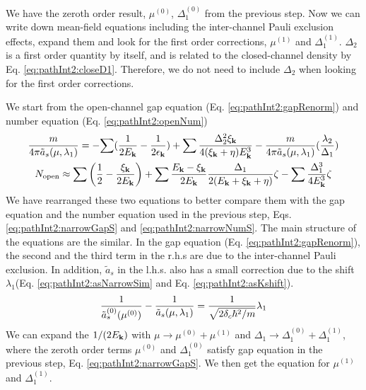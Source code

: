  
  We have the zeroth order result, $\mu^{(0)}$,  $\Delta_1^{(0)}$ from the previous step.  Now we can write down mean-field equations   including the inter-channel Pauli exclusion effects,  expand them and look for the first order corrections,  $\mu^{(1)}$ and $\Delta_1^{(1)}$.
$\Delta_{2}$ is a first order quantity by itself,  and is related to the closed-channel density by Eq. \ref{eq:pathInt2:closeD1}. Therefore, we do not need to include $\Delta_{2}$ when looking for the first order corrections. 


We start from the open-channel  gap equation (Eq. \ref{eq:pathInt2:gapRenorm}) and number equation (Eq. \ref{eq:pathInt2:openNum}) 
\begin{gather}
\frac{m}{4\pi{\tilde{a}_{s}(\mu,\lambda_{1})}}=-{\sum(\nth{2E_{\vk}}-\nth{2\epsilon_{\vk}})
+\sum\frac{\Delta_{2}^{2}\xi_{\vk}}{4(\xi_{\vk}+\eta){E_{\vk}^{3}}}}
-\frac{m}{4\pi{\tilde{a}_{s}(\mu,\lambda_{1})}}(\frac{\lambda_{2}}{\Delta_{1}})
	\\
N_{\text{open}}\approx\sum{\br{\nth{2}-\frac{\xi_\vk}{2E_\vk}}+\sum\frac{E_\vk-\xi_\vk}{2E_\vk}\frac{\Delta_{1}}{2(E_{\vk}+\xi_{\vk}+\eta)}\zeta -\sum\frac{\Delta_{1}^{3}}{4E_\vk^{3}}\zeta}%
\end{gather}
We have rearranged these two equations to better compare them  with  the gap equation and the number equation used in the previous step, Eqs. \ref{eq:pathInt2:narrowGapS} and \ref{eq:pathInt2:narrowNumS}.        The main structure of the equations are the similar. In the gap equation (Eq. \ref{eq:pathInt2:gapRenorm}), the second and the third term in the r.h.s are due to the inter-channel Pauli exclusion.  In addition, $\tilde{a}_{s}$ in the l.h.s. also has a small correction due to the shift $\lambda_{1}$(Eq. \ref{eq:pathInt2:asNarrowSim} and Eq. \ref{eq:pathInt2:asKshift}).  
\begin{equation}
\frac{1}{\tilde{a}_{s}^{{(0)}}(\mu^{(0)})}-\frac{1}{\tilde{a}_{s}(\mu,\lambda_{1})}=\frac{1}{\sqrt{2\delta_{c}\hbar^{2}/m}}\lambda_1
\end{equation}
We can expand the $1/(2E_{\mathbf{k}})$  with $\mu\to\mu^{(0)}+\mu^{(1)}$ and $\Delta_1\to\Delta_1^{(0)}+\Delta_1^{(1)}$, where the zeroth order terms $\mu^{(0)}$ and $\Delta_1^{(0)}$ satisfy gap equation in the previous step, Eq. \ref{eq:pathInt2:narrowGapS}.      
We then get the equation for  $\mu^{(1)}$ and $\Delta_1^{(1)}$. 

